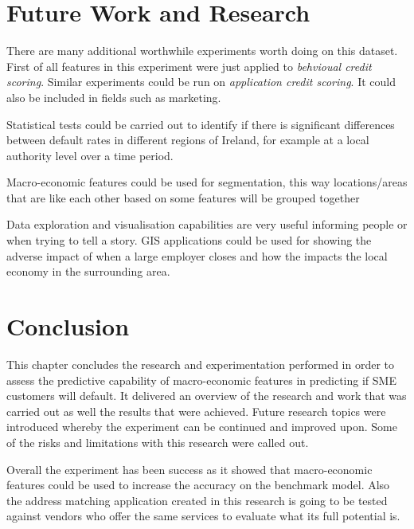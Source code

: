 \section{Future Work and Research}

There are many additional worthwhile experiments worth doing on this dataset. First of all features in this experiment were just applied to \textit{behvioual credit scoring}. Similar experiments could be run on \textit{application credit scoring}. It could also be included in fields such as marketing.

Statistical tests could be carried out to identify if there is significant differences between default rates in different regions of Ireland, for example at a local authority level over a time period. 

Macro-economic features could be used for segmentation, this way locations/areas that are like each other based on some features will be grouped together

Data exploration and visualisation capabilities are very useful informing people or when trying to tell a story. GIS applications could be used for showing the adverse impact of when a large employer closes and how the impacts the local economy in the surrounding area.
\section{Conclusion}
This chapter concludes the research and experimentation performed in order to assess the predictive capability of macro-economic features in predicting if SME customers will default. It delivered an overview of the research and work that was carried out as well the results that were achieved. Future research topics were introduced whereby the experiment can be continued and improved upon. Some of the risks and limitations with this research were called out.

Overall the experiment has been success as it showed that macro-economic features could be used to increase the accuracy on the benchmark model. Also the address matching application created in this research is going to be tested against vendors who offer the same services to evaluate what its full potential is.









